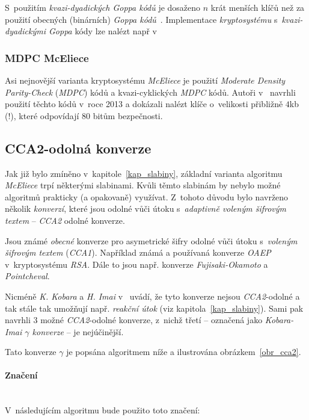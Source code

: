 \documentclass[thesis=M,czech,hidelinks]{FITthesis}[2012/06/26]
\newcommand{\0}{{\textcolor[gray]{0.80}{0}}}
\begin{document}
S~použitím \emph{kvazi-dyadických Goppa kódů} je dosaženo $n$ krát menších klíčů
než za použití obecných (binárních) \emph{Goppa kódů}~\cite{Misoczki1}.
Implementace \emph{kryptosystému} s~\emph{kvazi-dyadickými Goppa} kódy lze
nalézt např v~\cite{Paustjan,Kratochvil}

\subsubsection{MDPC McEliece}

Asi nejnovější varianta kryptosystému \emph{McEliece} je použití \emph{Moderate
Density Parity-Check} (\emph{MDPC}) kódů a kvazi-cyklických \emph{MDPC} kódů.
Autoři v~\cite{Misoczki2} navrhli použití těchto kódů v~roce 2013 a dokázali
nalézt klíče o~velikosti přibližně $4$\;kb (!), které odpovídají $80$ bitům
bezpečnosti.


\subsection{CCA2-odolná konverze}\label{kap_cca2}

Jak již bylo zmíněno v~kapitole~\ref{kap_slabiny}, základní varianta algoritmu
\emph{McEliece} trpí některými slabinami. Kvůli těmto slabinám by nebylo možné
algoritmů prakticky (a opakovaně) využívat. Z~tohoto důvodu bylo navrženo
několik \emph{konverzí}, které jsou odolné vůči útoku s~\emph{adaptivně voleným
šifrovým textem} -- \emph{CCA2} odolné konverze.

Jsou známé \emph{obecné} konverze pro asymetrické šifry odolné vůči útoku
s~\emph{voleným šifrovým textem} (\emph{CCA1}). Například známá a  používaná
konverze \emph{OAEP} v~kryptosystému \emph{RSA}. Dále to jsou např. konverze
\emph{Fujisaki-Okamoto} a \emph{Pointcheval}.

Nicméně \emph{K. Kobara} a \emph{H. Imai} v~\cite{Kobara} uvádí, že tyto
konverze nejsou \emph{CCA2}-odolné a tak stále tak umožňují např. \emph{reakční
útok} (viz kapitola~\ref{kap_slabiny}). Sami pak navrhli 3 možné
\emph{CCA2}-odolné konverze, z~nichž třetí -- označená jako \emph{Kobara-Imai
$\gamma$ konverze} -- je nejúčinější.

Tato konverze $\gamma$ je popsána algoritmem níže a ilustrována
obrázkem~\ref{obr_cca2}.

\paragraph{Značení} \hfil \\
V~následujícím algoritmu bude použito toto značení:
\end{document}
